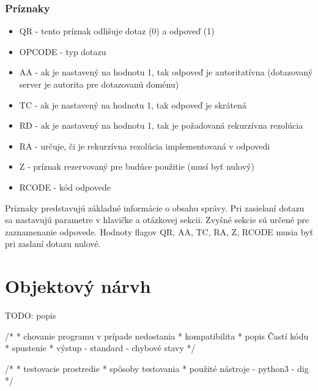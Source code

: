 \subsubsection{Príznaky}
\begin{itemize}
    \item QR - tento príznak odlišuje dotaz (0) a odpoveď (1)
    \item OPCODE - typ dotazu
    \item AA - ak je nastavený na hodnotu 1, tak odpoveď je autoritatívna (dotazovaný server je autorita pre dotazovanú doménu)
    \item TC - ak je nastavený na hodnotu 1, tak odpoveď je skrátená
    \item RD - ak je nastavený na hodnotu 1, tak je požadovaná rekurzívna rezolúcia
    \item RA - určuje, či je rekurzívna rezolúcia implementovaná v odpovedi
    \item Z - príznak rezervovaný pre budúce použitie (musí byť nulový)
    \item RCODE - kód odpovede
\end{itemize}

Príznaky predstavujú základné informácie o obsahu správy.
Pri zasielaní dotazu sa nastavujú parametre v hlavičke a otázkovej sekcii. Zvyšné sekcie sú určené pre zaznamenanie odpovede. Hodnoty flagov
QR, AA, TC, RA, Z, RCODE musia byť pri zaslaní dotazu nulové.

\section{Objektový nárvh}
\label{Objektový návrh}

TODO: popis





/*
 * chovanie programu v prípade nedostania
 * kompatibilita
 * popis Častí kódu 
 * spustenie
 * výstup   - standard
            - chybové stavy
 */



/*
 * testovacie prostredie
 * spôsoby testovania
 * použité nástroje - python3
                    - dig 
 */

 

